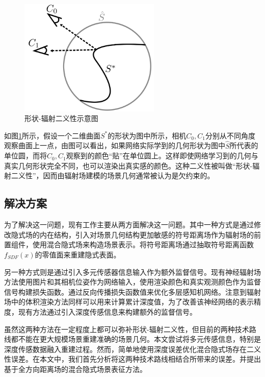 \begin{figure}[ht]
    \centering
    \includegraphics[width=0.6\textwidth]{undergraduate-thesis/images/shape-radiance ambiguity.png}
    \caption{形状-辐射二义性示意图\cite{zhang_nerf_2020}}
    \label{fig:omni-nerf shape-radiance ambiguity}
\end{figure}

如图\ref{fig:omni-nerf shape-radiance ambiguity}所示，假设一个二维曲面$S^*$的形状为图中所示，相机$C_0, C_1$分别从不同角度观察曲面上一点，由图可以看出，如果网络实际学到的几何形状为图中$\hat{S}$所代表的单位圆，而将$C_0, C_1$观察到的颜色“贴”在单位圆上。这样即使网络学习到的几何与真实几何形状完全不同，也可以渲染出真实感的颜色。这种二义性被叫做“形状-辐射二义性”\cite{zhang_nerf_2020}，因而由辐射场建模的场景几何通常被认为是欠约束的。

\subsection{解决方案}

为了解决这一问题，现有工作主要从两方面解决这一问题。其中一种方式是通过修改隐式场的内在结构，引入对场景几何结构更加敏感的符号距离场作为辐射场的前置组件，使用混合隐式场来构造场景表示。将符号距离场通过抽取符号距离函数$f_{SDF}(x)$的零值面来重建隐式表面。

另一种方式则是通过引入多元传感器信息输入作为额外监督信号。现有神经辐射场方法使用图片和其相机位姿作为网络输入，使用渲染颜色和真实观测颜色作为监督信号构建损失函数。通过反向传播损失函数值来优化多层感知机网络。注意到辐射场中的体积渲染方法同样可以用来计算累计深度值，为了改善该神经网络的表示精度，现有方法通过引入深度传感信息来构建额外的监督信号\cite{deng_depth-supervised_2022, roessle_dense_2022, azinovic_neural_2022}。

虽然这两种方法在一定程度上都可以弥补形状-辐射二义性，但目前的两种技术路线都不能在更大规模场景重建准确的场景几何。本文尝试将多元传感信息，特别是深度传感数据融入重建过程。然而，简单地使用深度误差优化混合隐式场存在二义性误差。在本文中，我们首先分析将这两种技术路线相结合所带来的误差。并提出基于全方向距离场的混合隐式场景表征方法。

